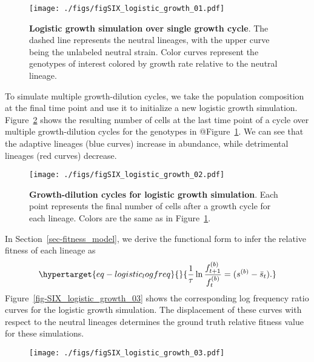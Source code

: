 \documentclass[
  letterpaper,
  DIV=11,
  numbers=noendperiod]{scrartcl}
\begin{document}
\begin{refsegment}
\begin{figure}
{\centering \texttt{[image: ./figs/figSIX\_logistic\_growth\_01.pdf]}

}

\caption{\label{fig-SIX_logistic_growth_01}\textbf{Logistic growth
simulation over single growth cycle}. The dashed line represents the
neutral lineages, with the upper curve being the unlabeled neutral
strain. Color curves represent the genotypes of interest colored by
growth rate relative to the neutral lineage.}

\end{figure}

To simulate multiple growth-dilution cycles, we take the population
composition at the final time point and use it to initialize a new
logistic growth simulation. Figure~\ref{fig-SIX_logistic_growth_02}
shows the resulting number of cells at the last time point of a cycle
over multiple growth-dilution cycles for the genotypes in
@Figure~\ref{fig-SIX_logistic_growth_01}. We can see that the adaptive
lineages (blue curves) increase in abundance, while detrimental lineages
(red curves) decrease.

\begin{figure}

{\centering \texttt{[image: ./figs/figSIX\_logistic\_growth\_02.pdf]}

}

\caption{\label{fig-SIX_logistic_growth_02}\textbf{Growth-dilution
cycles for logistic growth simulation}. Each point represents the final
number of cells after a growth cycle for each lineage. Colors are the
same as in Figure~\ref{fig-SIX_logistic_growth_01}.}

\end{figure}

In Section~\ref{sec-fitness_model}, we derive the functional form to
infer the relative fitness of each lineage as
\begin{equation}\protect\hypertarget{eq-logistic_logfreq}{}{
\frac{1}{\tau}\ln \frac{f_{t+1}^{(b)}}{f_{t}^{(b)}} = (s^{(b)} - \bar{s}_t).
}\label{eq-logistic_logfreq}\end{equation}
Figure~\ref{fig-SIX_logistic_growth_03} shows the corresponding log
frequency ratio curves for the logistic growth simulation. The
displacement of these curves with respect to the neutral lineages
determines the ground truth relative fitness value for these
simulations.

\begin{figure}

{\centering \texttt{[image: ./figs/figSIX\_logistic\_growth\_03.pdf]}

}
\end{figure}
\end{refsegment}
\end{document}
